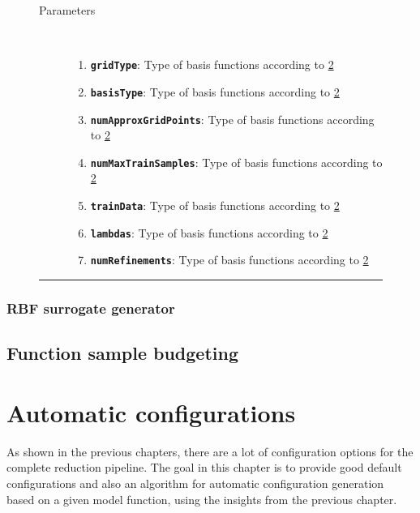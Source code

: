 \documentclass[
  a4paper,  %
  twoside,  %
  bibliography=totoc,
  headsepline,
  cleardoublepage=empty,
  parskip=half,
  draft=false
]{scrbook}
\newcommand{\delimit}{{\color{charcoal}\noindent\rule{\textwidth}{1pt}}}
\begin{document}
\newpage

\begin{mdframed}[style=style,frametitle={Surrogate generator (sparse grid)}]
\begin{figure}[H]
\begin{description}
\item[Parameters] {~ \begin{enumerate}[\indent{}]
\item \texttt{\textbf{gridType}}: Type of basis functions according to \ref{}
\item \texttt{\textbf{basisType}}: Type of basis functions according to \ref{}
\item \texttt{\textbf{numApproxGridPoints}}: Type of basis functions according to \ref{}
\item \texttt{\textbf{numMaxTrainSamples}}: Type of basis functions according to \ref{}
\item \texttt{\textbf{trainData}}: Type of basis functions according to \ref{}
\item \texttt{\textbf{lambdas}}: Type of basis functions according to \ref{}
\item \texttt{\textbf{numRefinements}}: Type of basis functions according to \ref{}
\end{enumerate}}
\end{description}

\delimit

\label{fig:sgsg}
\end{figure}
\end{mdframed}

\subsection {RBF surrogate generator}


\section{Function sample budgeting}

\chapter{Automatic configurations}

As shown in the previous chapters, there are a lot of configuration options for the complete reduction pipeline.
The goal in this chapter is to provide good default configurations and also an algorithm for automatic configuration generation based on a given model function, using the insights from the previous chapter.
\end{document}
